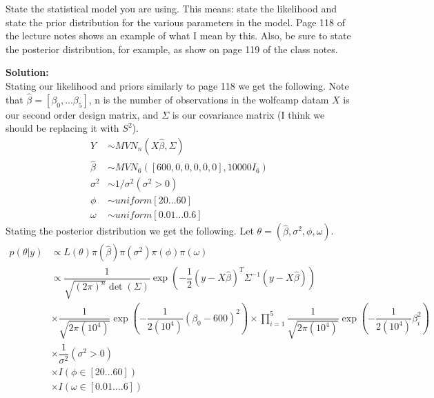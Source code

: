 \documentclass[12pt]{article}
\makeatletter
\theoremstyle{homework}
\newenvironment{exercise}[1]
{\def\@currentlabel{#1}\exercisecore}
{\endexercisecore}
\newcommand{\localhead}[1]{\par\smallskip\noindent\textbf{#1}\nobreak\\}%
\newcommand\solution{\localhead{Solution:}}
\makeatother
\begin{document}
\begin{exercise}{4} State the statistical model you are using. This means: state the likelihood and state the prior 
  distribution for the various parameters in the model. Page 118 of the lecture notes shows an example of what I mean by this. Also, be sure 
  to state the posterior distribution, for example, as show on page 119 of the class notes.\\ 
  \solution Stating our likelihood and priors similarly to page 118 we get the following. Note that $\hat{\beta} = [\beta_0, ... \beta_5]$, n is the number of 
  observations in the wolfcamp datam $X$ is our second order design matrix, and $\Sigma$ is our covariance matrix (I think we should be replacing it with $S^2$).  
  \begin{align*}
    Y &\sim MVN_n\left(X\hat{\beta}, \Sigma \right)\\
    \hat{\beta} &\sim MVN_6 \left([600, 0, 0, 0, 0, 0],10000I_6 \right)\\
    \sigma^2 &\sim 1/\sigma^2 (\sigma^2 > 0)\\ 
    \phi &\sim uniform[20 \dots 60]\\
    \omega &\sim  uniform[0.01 \dots 0.6]
  \end{align*}
  Stating the posterior distribution we get the following. Let $\theta = (\hat{\beta}, \sigma^2, \phi, \omega)$.
  \begin{align*}
    p(\theta | y) &\propto L(\theta)\pi(\hat{\beta})\pi(\sigma^2)\pi(\phi)\pi(\omega)\\ 
    &\propto \dfrac{1}{\sqrt{(2\pi)^n}\det(\Sigma)} \exp(-\dfrac{1}{2}(y - X\hat{\beta})^T\Sigma^{-1}(y - X\hat{\beta}))\\ 
    &\times \dfrac{1}{\sqrt{2\pi(10^4)}} \exp\left(-\dfrac{1}{2(10^4)}(\beta_0 - 600)^2\right) \times \prod_{i = 1}^5 \dfrac{1}{\sqrt{2\pi(10^4)}} \exp\left(-\dfrac{1}{2(10^4)}\beta_i^2\right)\\
    &\times \dfrac{1}{\sigma^2} (\sigma^2 > 0)\\
    &\times I(\phi \in [20 \dots 60])\\
    &\times I(\omega \in [0.01 \dots .6])
  \end{align*}
\end{exercise}
\vspace{1in}
\end{document}

